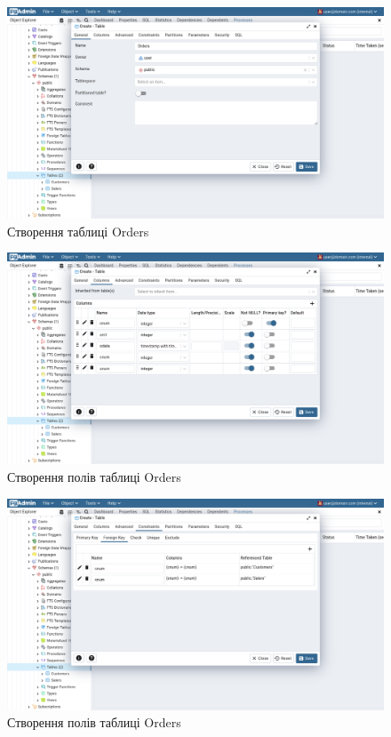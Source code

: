 \documentclass[14pt]{extreport}
\begin{document}
\begin{normalsize}
	\begin{figure}[H]
		\centering
		\includegraphics[scale=0.35]{13}
		\caption{Створення таблиці Orders}
	\end{figure}
	
	\begin{figure}[H]
		\centering
		\includegraphics[scale=0.35]{14}
		\caption{Створення полів таблиці Orders}
	\end{figure}
	
	\begin{figure}[H]
		\centering
		\includegraphics[scale=0.35]{15}
		\caption{Створення полів таблиці Orders}
	\end{figure}
	

\end{normalsize}
\end{document}
